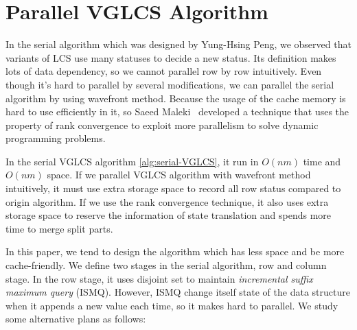 \section{Parallel VGLCS Algorithm} %
\label{sec:parallelSerial}

In the serial algorithm which was designed by Yung-Hsing Peng, we
observed that variants of LCS use many statuses to decide a new
status.  Its definition makes lots of data dependency, so we cannot
parallel row by row intuitively.  Even though it's hard to parallel by
several modifications, we can parallel the serial algorithm by using
wavefront method.  Because the usage of the cache memory is hard to
use efficiently in it, so Saeed Maleki~\cite{Maleki2016EfficientPU}
developed a technique that uses the property of rank convergence to
exploit more parallelism to solve dynamic programming problems.

\iffalse
在 $O(nm \alpha(n))$ 的序列算法 \ref{alg:serial-VGLCS} 中，
我們發現算法如大多數的變型 LCS 相同，依賴數個狀態以轉移當前狀態，
大量的資料依賴性不易於細粒度平行。使用波前運行平行是一種常見的解決方案，
由於這種平行對於運行時的快取不友善 (cache-unfriendly)，
在 Saeed Maleki ~\cite{saeed} 論文中提到如何使用 Rank Convergence 的特殊性質，
拓展出更高平行度來解決動態規劃的相關問題。
\fi



In the serial VGLCS algorithm \ref{alg:serial-VGLCS}, it run in
$O(nm)$ time and $O(nm)$ space.  If we parallel VGLCS algorithm with
wavefront method intuitively, it must use extra storage space to
record all row status compared to origin algorithm.  If we use the
rank convergence technique, it also uses extra storage space to
reserve the information of state translation and spends more time to
merge split parts.

\iffalse
序列算法的空間複雜度為 $O(nm)$。若使用波前平行，需要同時維護橫向的所有狀態，
需要多付出一倍的空間量。若加入 Rank Convergence 的想法拓展出，
勢必要記錄轉移的狀態，需要耗費更多的記憶體空間，用以在最後階段合併所用。
\fi

In this paper, we tend to design the algorithm which has less space
and be more cache-friendly.  We define two stages in the serial
algorithm, row and column stage.  In the row stage, it uses disjoint
set to maintain \emph{incremental suffix maximum query} (ISMQ).
However, ISMQ change itself state of the data structure when it
appends a new value each time, so it makes hard to parallel.  We study
some alternative plans as follows:

